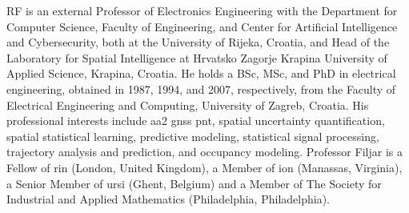 \let\LaTeXcline\cline\documentclass[sn-mathphys-num]{sn-jnl}\let\cline\LaTeXcline
\begin{document}
RF is an external Professor of Electronics Engineering with the Department for Computer Science, Faculty of Engineering, and Center for Artificial Intelligence and Cybersecurity, both at the University of Rijeka, Croatia, and Head of the Laboratory for Spatial Intelligence at Hrvatsko Zagorje Krapina University of Applied Science, Krapina, Croatia. He holds a BSc, MSc, and PhD in electrical engineering, obtained in 1987, 1994, and 2007, respectively, from the Faculty of Electrical Engineering and Computing, University of Zagreb, Croatia. His professional interests include \acrfull{aa2} \acrfull{gnss} \acrfull{pnt}, spatial uncertainty quantification, spatial statistical learning, predictive modeling, statistical signal processing, trajectory analysis and prediction, and occupancy modeling. Professor Filjar is a Fellow of \acrfull{rin} (London, United Kingdom), a Member of \acrfull{ion} (Manassas, Virginia), a Senior Member of \acrfull{ursi} (Ghent, Belgium) and a Member of The Society for Industrial and Applied Mathematics  (Philadelphia, Philadelphia).


\end{document}
